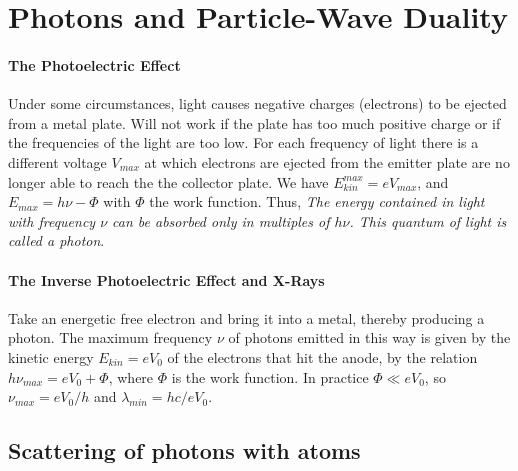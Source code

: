 \section{Photons and Particle-Wave Duality}

\paragraph{The Photoelectric Effect}
Under some circumstances, light causes negative charges (electrons) to be ejected
from a metal plate. Will not work if the plate has too much positive charge or if
the frequencies of the light are too low.
For each frequency of light there is a different voltage $V_{max}$ at which
electrons are ejected from the emitter plate are no longer able to reach the
the collector plate. We have $E_{kin}^{max} = e V_{max}$, and
$E_{max} = h \nu - \Phi$ with $\Phi$ the work function. Thus, \textit{The energy
contained in light with frequency $\nu$ can be absorbed only in multiples of
$h \nu$. This quantum of light is called a photon}.

\paragraph{The Inverse Photoelectric Effect and X-Rays}
Take an energetic free electron and bring it into a metal, thereby producing a
photon. The maximum frequency $\nu$ of photons emitted in this way is given by
the kinetic energy $E_{kin} = e V_0$ of the electrons that hit the anode, by the
relation $h \nu_{max} = e V_0 + \Phi$, where $\Phi$ is the work function.
In practice $\Phi \ll e V_0$, so $\nu_{max} = e V_0 / h$ and $\lambda_{min} =
h c / e V_0$.

\subsection{Scattering of photons with atoms}

